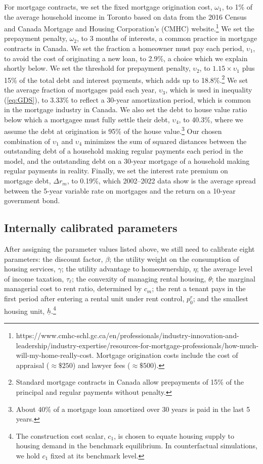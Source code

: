\documentclass[parskip=full]{article}
\begin{document}
For mortgage contracts, we set the fixed mortgage origination cost, $\omega_{1}$, to 1\% of the average household income in Toronto based on data from the 2016 Census and Canada Mortgage and Housing Corporation's (CMHC) website.\footnote{https://www.cmhc-schl.gc.ca/en/professionals/industry-innovation-and-leadership/industry-expertise/resources-for-mortgage-professionals/how-much-will-my-home-really-cost. Mortgage origination costs include the cost of appraisal ($\approx\$250$) and lawyer fees ($\approx\$500$).} We set the prepayment penalty, $\omega_{2}$, to 3 months of interests, a common practice in mortgage contracts in Canada. We set the fraction a homeowner must pay each period, $\upsilon_{1}$, to avoid the cost of originating a new loan, to 2.9\%, a choice which we explain shortly below. We set the threshold for prepayment penalty, $\upsilon_{2}$, to $1.15 \times \upsilon_{1}$ plus 15\% of the total debt and interest payments, which adds up to 18.8\%.\footnote{Standard mortgage contracts in Canada allow prepayments of 15\% of the principal and regular payments without penalty.} We set the average fraction of mortgages paid each year, $\upsilon_{3}$, which is used in inequality (\ref{eq:GDS}), to 3.33\% to reflect a 30-year amortization period, which is common in the mortgage industry in Canada. We also set the debt to house value ratio below which a mortgagee must fully settle their debt, $\upsilon_{4}$, to 40.3\%, where we assume the debt at origination is 95\% of the house value.\footnote{About 40\% of a mortgage loan amortized over 30 years is paid in the last 5 years.} Our chosen combination of $\upsilon_{1}$ and $\upsilon_{4}$ minimizes the sum of squared distances between the outstanding debt of a household making regular payments each period in the model, and the outstanding debt on a 30-year mortgage of a household making regular payments in reality. Finally, we set the interest rate premium on mortgage debt, $\Delta r_{m}$, to 0.19\%, which 2002--2022 data show is the average spread between the 5-year variable rate on mortgages and the return on a 10-year government bond.

\subsection{Internally calibrated parameters}

After assigning the parameter values listed above, we still need to calibrate eight parameters: the discount factor, $\beta$; the utility weight on the consumption of housing services, $\gamma$; the utility advantage to homeownership, $\eta$; the average level of income taxation, $\tau_{\ell}$; the convexity of managing rental housing, $\theta$; the marginal managerial cost to rent ratio, determined by $c_{m}$; the rent a tenant pays in the first period after entering a rental unit under rent control, $p^{r}_{0}$; and the smallest housing unit, $\underline{h}$.\footnote{The construction cost scalar, $c_{1}$, is chosen to equate housing supply to housing demand in the benchmark equilibrium. In counterfactual simulations, we hold $c_{1}$ fixed at its benchmark level.}
\end{document}
